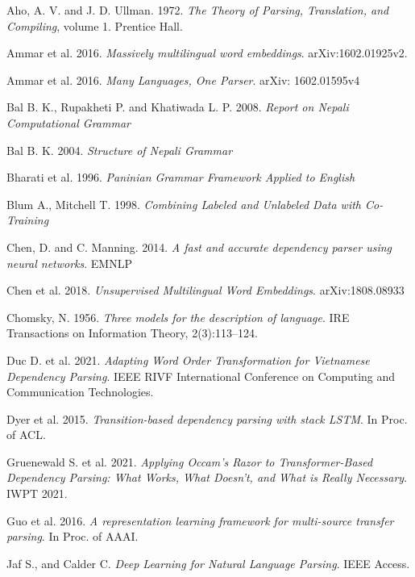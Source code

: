 \begin{thebibliography}{}

Aho, A. V. and J. D. Ullman. 1972. \textit{The Theory of Parsing,
        Translation, and Compiling}, volume 1. Prentice Hall.

Ammar et al. 2016. \textit{Massively multilingual word embeddings}.
        arXiv:1602.01925v2.

Ammar et al. 2016. \textit{Many Languages, One Parser}. arXiv: 1602.01595v4

Bal B. K., Rupakheti P. and Khatiwada L. P. 2008. \textit{Report on
        Nepali Computational Grammar}

Bal B. K. 2004. \textit{Structure of Nepali Grammar}

Bharati et al. 1996. \textit{Paninian Grammar Framework Applied to
        English}

Blum A., Mitchell T. 1998. \textit{Combining Labeled and Unlabeled Data with Co-Training} %

Chen, D. and C. Manning. 2014. \textit{A fast and accurate dependency
        parser using neural networks}. EMNLP

Chen et al. 2018. \textit{Unsupervised Multilingual Word Embeddings}. arXiv:1808.08933

Chomsky, N. 1956. \textit{Three models for the description of language}. IRE Transactions on Information Theory, 2(3):113–124.

Duc D. et al. 2021. \textit{Adapting Word Order Transformation for Vietnamese Dependency Parsing}. IEEE RIVF International Conference on Computing and Communication Technologies.

Dyer et al. 2015. \textit{Transition-based dependency parsing with
        stack LSTM}. In Proc. of ACL.

Gruenewald S. et al. 2021. \textit{Applying Occam’s Razor to Transformer-Based Dependency Parsing: What Works, What Doesn’t, and What is Really Necessary}. IWPT 2021.

Guo et al. 2016. \textit{A representation learning framework for multi-source transfer parsing}. In Proc. of AAAI.

Jaf S., and Calder C. \textit{Deep Learning for Natural Language Parsing}. IEEE Access.


\end{thebibliography}
